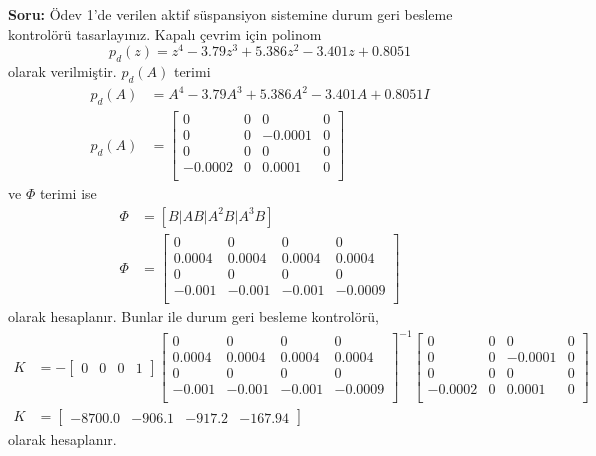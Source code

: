 \noindent\textbf{Soru:} Ödev 1'de verilen aktif süspansiyon sistemine durum geri besleme kontrolörü tasarlayınız. Kapalı çevrim için polinom
\begin{equation}
    p_d(z)=z^4- 3.79z^3  + 5.386z^2 - 3.401z+0.8051
\end{equation}
olarak verilmiştir. $p_d(A)$ terimi
\begin{equation}
\begin{split}
    p_d(A)&=A^4- 3.79A^3  + 5.386A^2 - 3.401A+0.8051I\\
    p_d(A)&=\begin{bmatrix}
      0& 0&       0& 0\\
      0& 0& -0.0001& 0\\
      0& 0&       0& 0\\
-0.0002& 0&  0.0001& 0\\
    \end{bmatrix}
\end{split}
\end{equation}
ve $\Phi$ terimi ise 
\begin{equation}
\begin{split}
    \Phi&=[B|AB|A^2B|A^3B]\\
    \Phi&=\begin{bmatrix}
        0&      0&      0&       0\\
    0.0004& 0.0004& 0.0004&  0.0004\\
        0&      0&      0&       0\\
    -0.001& -0.001& -0.001& -0.0009\\
    \end{bmatrix}
\end{split}
\end{equation}
olarak hesaplanır. Bunlar ile durum geri besleme kontrolörü,
\begin{equation}
\begin{split}
    K&=-\begin{bmatrix}0&0&0&1\end{bmatrix}\begin{bmatrix}
        0&      0&      0&       0\\
    0.0004& 0.0004& 0.0004&  0.0004\\
        0&      0&      0&       0\\
    -0.001& -0.001& -0.001& -0.0009\\
    \end{bmatrix}^{-1}\begin{bmatrix}
        0& 0&       0& 0\\
        0& 0& -0.0001& 0\\
        0& 0&       0& 0\\
  -0.0002& 0&  0.0001& 0\\
      \end{bmatrix}\\
    K&=\begin{bmatrix}-8700.0& -906.1& -917.2& -167.94\end{bmatrix}
\end{split}
\end{equation}
olarak hesaplanır.


